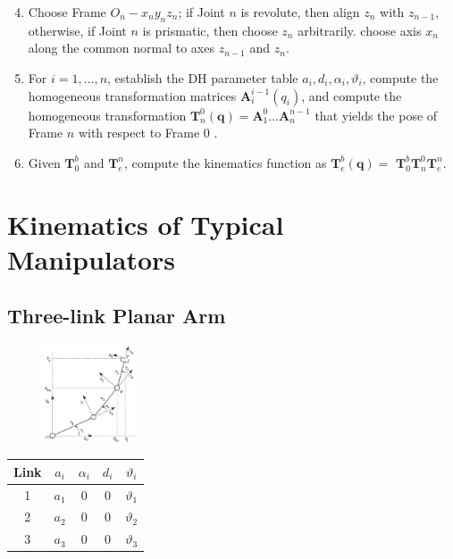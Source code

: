 \documentclass[10pt]{article}
\begin{document}
\begin{enumerate}
  \setcounter{enumi}{3}
  \item Choose Frame $O_{n}-x_{n} y_{n} z_{n}$; if Joint $n$ is revolute, then align $z_{n}$ with $z_{n-1}$, otherwise, if Joint $n$ is prismatic, then choose $z_{n}$ arbitrarily. choose axis $x_{n}$ along the common normal to axes $z_{n-1}$ and $z_{n}$.

  \item For $i=1, \ldots, n$, establish the DH parameter table $a_{i}, d_{i}, \alpha_{i}, \vartheta_{i}$,
  compute the homogeneous transformation matrices $\boldsymbol{A}_{i}^{i-1}\left(q_{i}\right)$, and compute the homogeneous transformation $\boldsymbol{T}_{n}^{0}(\boldsymbol{q})=\boldsymbol{A}_{1}^{0} \ldots \boldsymbol{A}_{n}^{n-1}$ that yields the pose of Frame $n$ with respect to Frame 0 .
  
  \item Given $\boldsymbol{T}_{0}^{b}$ and $\boldsymbol{T}_{e}^{n}$, compute the  kinematics function as $\boldsymbol{T}_{e}^{b}(\boldsymbol{q})=$ $\boldsymbol{T}_{0}^{b} \boldsymbol{T}_{n}^{0} \boldsymbol{T}_{e}^{n}$.

\end{enumerate}



\section{Kinematics of Typical Manipulators}






\subsection{Three-link Planar Arm}
\begin{figure}[H]
    \centering
   \includegraphics[max width=0.25\textwidth]{./kinematics/3link_arm}
    \label{c1.l2.three-link-robot-arm}
\end{figure}




\begin{table}[h]
\begin{center}
\begin{tabular}{ccccc}
\hline
Link & $a_{i}$ & $\alpha_{i}$ & $d_{i}$ & $\vartheta_{i}$ \\
\hline
1 & $a_{1}$ & 0 & 0 & $\vartheta_{1}$ \\
2 & $a_{2}$ & 0 & 0 & $\vartheta_{2}$ \\
3 & $a_{3}$ & 0 & 0 & $\vartheta_{3}$ \\
\hline
\end{tabular}
\label{c1.l2.table.three-link-dh}
\end{center}
\end{table}
\end{document}
